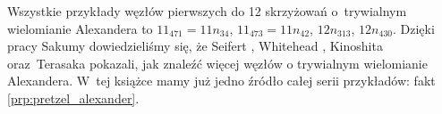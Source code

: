 Wszystkie przykłady węzłów pierwszych do 12 skrzyżowań o~trywialnym wielomianie Alexandera to $11_{471} = 11n_{34}$, $11_{473} = 11n_{42}$, $12n_{313}$, $12n_{430}$.
Dzięki pracy Sakumy \cite{sakuma2020} dowiedzieliśmy się, że Seifert \cite{seifert1935}, Whitehead \cite{whitehead1937}, Kinoshita oraz~Terasaka \cite{kinoshita1957} pokazali, jak znaleźć więcej węzłów o trywialnym wielomianie Alexandera.
%
%
%
%
%
W~tej książce mamy już jedno źródło całej serii przykładów: fakt \ref{prp:pretzel_alexander}.

